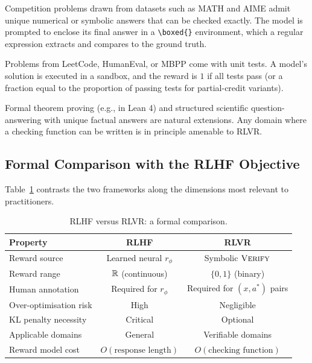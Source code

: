 \begin{description}[leftmargin=!,labelwidth=3.5cm]
\item[Mathematics] Competition problems drawn from datasets such as
  MATH and AIME admit unique numerical or symbolic answers that can
  be checked exactly. The model is prompted to enclose its final
  answer in a \texttt{\textbackslash boxed\{\}} environment, which a
  regular expression extracts and compares to the ground truth.

\item[Code generation] Problems from LeetCode, HumanEval, or MBPP
  come with unit tests. A model's solution is executed in a sandbox,
  and the reward is $1$ if all tests pass (or a fraction equal to the
  proportion of passing tests for partial-credit variants).

\item[Science and logic] Formal theorem proving (e.g., in Lean 4) and
  structured scientific question-answering with unique factual answers
  are natural extensions. Any domain where a checking function can be
  written is in principle amenable to RLVR.
\end{description}

\subsection{Formal Comparison with the RLHF Objective}
\label{subsec:rlvr-vs-rlhf}

Table~\ref{tab:rlhf-vs-rlvr} contrasts the two frameworks along the
dimensions most relevant to practitioners.

\begin{table}[ht]
\centering
\small
\caption{RLHF versus RLVR: a formal comparison.}
\label{tab:rlhf-vs-rlvr}
\begin{tabular}{@{}lcc@{}}
\toprule
\textbf{Property} & \textbf{RLHF} & \textbf{RLVR} \\
\midrule
Reward source & Learned neural $r_\phi$ & Symbolic $\textsc{Verify}$ \\
Reward range & $\mathbb{R}$ (continuous) & $\{0, 1\}$ (binary) \\
Human annotation & Required for $r_\phi$ & Required for $(x, a^*)$ pairs \\
Over-optimisation risk & High & Negligible \\
KL penalty necessity & Critical & Optional \\
Applicable domains & General & Verifiable domains \\
Reward model cost & $O(\text{response length})$ & $O(\text{checking function})$ \\
\bottomrule
\end{tabular}
\end{table}

